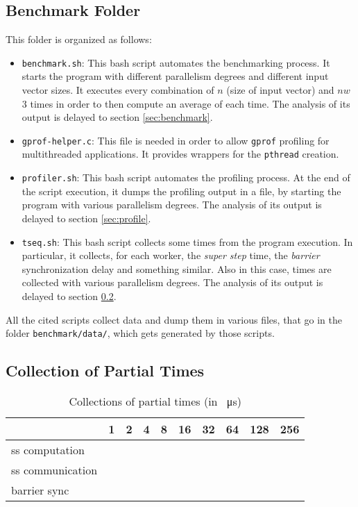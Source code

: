 \documentclass[]{article}
\def\code#1{\texttt{#1}}
\begin{document}
\subsection{Benchmark Folder}
\label{sec:benchFold}
This folder is organized as follows:
\begin{itemize}
	\item \code{benchmark.sh}: This bash script automates the benchmarking process. It starts the program with different parallelism degrees and different input vector sizes. It executes every combination of $n$ (size of input vector) and $\mathit{nw}$ 3 times in order to then compute an average of each time. The analysis of its output is delayed to section \ref{sec:benchmark}.
	\item \code{gprof-helper.c}: This file is needed in order to allow \code{gprof} profiling for multithreaded applications. It provides wrappers for the \code{pthread} creation.
	\item \code{profiler.sh}: This bash script automates the profiling process. At the end of the script execution, it dumps the profiling output in a file, by starting the program with various parallelism degrees. The analysis of its output is delayed to section \ref{sec:profile}.
	\item \code{tseq.sh}: This bash script collects some times from the program execution. In particular, it collects, for each worker, the \emph{super step} time, the \emph{barrier} synchronization delay and something similar. Also in this case, times are collected with various parallelism degrees. The analysis of its output is delayed to section \ref{sec:tseq}.
\end{itemize}
All the cited scripts collect data and dump them in various files, that go in the folder \code{benchmark/data/}, which gets generated by those scripts.

\subsection{Collection of Partial Times}
\label{sec:tseq}
\begin{table}[H]
	\centering
	\begin{tabular}{l|*{9}r}
		\toprule
		\diagbox{phase}{$\mathit{nw}$} 
		& 1 & 2 & 4 & 8 & 16 & 32 & 64 & 128 & 256 \\
		\midrule
		ss computation \\
		ss communication \\
		barrier sync \\
		\bottomrule
	\end{tabular}%
	\label{tab:tseq}%
	\caption{Collections of partial times (in \SI{}{\micro \second})}
\end{table}%
\end{document}
